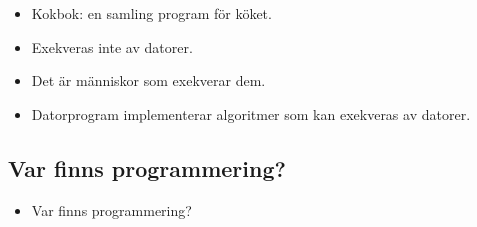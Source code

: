 
\begin{frame}
  \begin{remark}
    \begin{itemize}
      \item Kokbok: en samling program för köket.
      \item Exekveras inte av datorer.
      \item Det är människor som exekverar dem.
    \end{itemize}
  \end{remark}

  \pause

  \begin{remark}
    \begin{itemize}
      \item Datorprogram implementerar algoritmer som kan exekveras av datorer.
    \end{itemize}
  \end{remark}
\end{frame}


\subsection{Var finns programmering?}


\begin{frame}
  \begin{exercise}
    \begin{itemize}
      \item Var finns programmering?
    \end{itemize}
  \end{exercise}
\end{frame}

